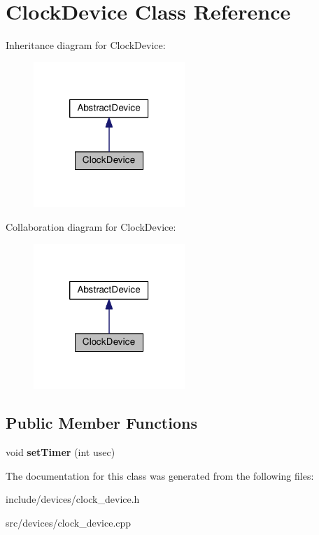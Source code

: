 \hypertarget{classClockDevice}{\section{\-Clock\-Device \-Class \-Reference}
\label{dc/d14/classClockDevice}
}


\-Inheritance diagram for \-Clock\-Device\-:\nopagebreak
\begin{figure}[H]
\begin{center}
\leavevmode
\includegraphics[width=162pt]{de/da0/classClockDevice__inherit__graph}
\end{center}
\end{figure}


\-Collaboration diagram for \-Clock\-Device\-:\nopagebreak
\begin{figure}[H]
\begin{center}
\leavevmode
\includegraphics[width=162pt]{d5/d1e/classClockDevice__coll__graph}
\end{center}
\end{figure}
\subsection*{\-Public \-Member \-Functions}
\begin{DoxyCompactItemize}
\item 
\hypertarget{classClockDevice_a780eebde86fb6a6400894128ac37fa37}{void {\bfseries set\-Timer} (int usec)}\label{dc/d14/classClockDevice_a780eebde86fb6a6400894128ac37fa37}

\end{DoxyCompactItemize}


\-The documentation for this class was generated from the following files\-:\begin{DoxyCompactItemize}
\item 
include/devices/clock\-\_\-device.\-h\item 
src/devices/clock\-\_\-device.\-cpp\end{DoxyCompactItemize}
